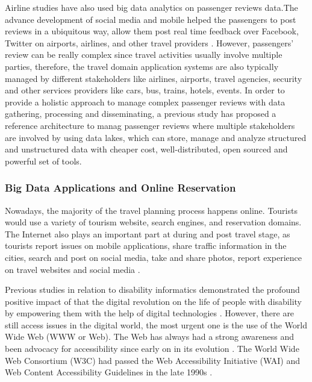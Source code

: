 Airline studies have also used big data analytics on passenger reviews data.The advance development of social media and mobile helped the passengers to post reviews in a ubiquitous way, allow them post real time feedback over Facebook, Twitter on airports, airlines, and other travel providers \cite{CHEN2016285}. However, passengers' review can be really complex since travel activities usually involve multiple parties, therefore, the travel domain application systems are also typically managed by different stakeholders like airlines, airports, travel agencies, security and other services providers like cars, bus, trains, hotels, events. In order to provide a holistic approach to manage complex passenger reviews with data gathering, processing and disseminating, a previous study has proposed a reference architecture to manag passenger reviews where multiple stakeholders are involved by using data lakes, which can store, manage and analyze structured and unstructured data with cheaper cost, well-distributed, open sourced and powerful set of tools.

\subsubsection{Big Data Applications and Online Reservation}
Nowadays, the majority of the travel planning process happens online. Tourists would use a variety of tourism website, search engines, and reservation domains. The Internet also plays an important part at during and post travel stage, as tourists report issues on mobile applications, share traffic information in the cities, search and post on social media, take and share photos, report experience on travel
websites and social media \cite{akerkar2012, Shafiee16}. 

Previous studies in relation to disability informatics  demonstrated 
the profound positive impact of  that the digital revolution on the life
of people with disability by empowering them with the help of digital technologies \cite{Appleyard2005}. However, there are still access issues in the digital world, the most urgent one is the use of the World Wide Web (WWW or Web). The Web has always had a strong awareness and been advocacy for accessibility since early on in its evolution \cite{Appleyard2005}. The World Wide Web Consortium (W3C) had passed the Web Accessibility Initiative (WAI) and Web Content Accessibility Guidelines in the late 1990s \cite{Appleyard2005}. 

